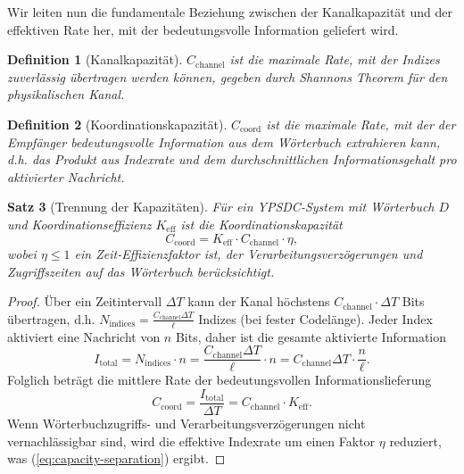\documentclass[12pt,a4paper]{article}
\newtheorem{theorem}{Satz}[section]
\newtheorem{definition}[theorem]{Definition}
\theoremstyle{remark}
\newcommand{\Keff}{K_{\mathrm{eff}}}
\begin{document}
	Wir leiten nun die fundamentale Beziehung zwischen der Kanalkapazität und der effektiven Rate her, mit der bedeutungsvolle Information geliefert wird.
	
	\begin{definition}[Kanalkapazität]
		$C_{\text{channel}}$ ist die maximale Rate, mit der Indizes zuverlässig übertragen werden können, gegeben durch Shannons Theorem für den physikalischen Kanal.
	\end{definition}
	
	\begin{definition}[Koordinationskapazität]
		$C_{\text{coord}}$ ist die maximale Rate, mit der der Empfänger bedeutungsvolle Information aus dem Wörterbuch extrahieren kann, d.h. das Produkt aus Indexrate und dem durchschnittlichen Informationsgehalt pro aktivierter Nachricht.
	\end{definition}
	
	\begin{theorem}[Trennung der Kapazitäten] \label{thm:capacity-separation}
		Für ein YPSDC-System mit Wörterbuch $D$ und Koordinationseffizienz $\Keff$ ist die Koordinationskapazität
		\begin{equation}
			C_{\text{coord}} = \Keff \cdot C_{\text{channel}} \cdot \eta,
			\label{eq:capacity-separation}
		\end{equation}
		wobei $\eta \le 1$ ein Zeit-Effizienzfaktor ist, der Verarbeitungsverzögerungen und Zugriffszeiten auf das Wörterbuch berücksichtigt.
	\end{theorem}
	
	\begin{proof}
		Über ein Zeitintervall $\Delta T$ kann der Kanal höchstens $C_{\text{channel}} \cdot \Delta T$ Bits übertragen, d.h. $N_{\text{indices}} = \frac{C_{\text{channel}} \Delta T}{\ell}$ Indizes (bei fester Codelänge). Jeder Index aktiviert eine Nachricht von $n$ Bits, daher ist die gesamte aktivierte Information
		\[
		I_{\text{total}} = N_{\text{indices}} \cdot n = \frac{C_{\text{channel}} \Delta T}{\ell} \cdot n = C_{\text{channel}} \Delta T \cdot \frac{n}{\ell}.
		\]
		Folglich beträgt die mittlere Rate der bedeutungsvollen Informationslieferung
		\[
		C_{\text{coord}} = \frac{I_{\text{total}}}{\Delta T} = C_{\text{channel}} \cdot \Keff.
		\]
		Wenn Wörterbuchzugriffs- und Verarbeitungsverzögerungen nicht vernachlässigbar sind, wird die effektive Indexrate um einen Faktor $\eta$ reduziert, was (\ref{eq:capacity-separation}) ergibt.
	\end{proof}
	
\end{document}
